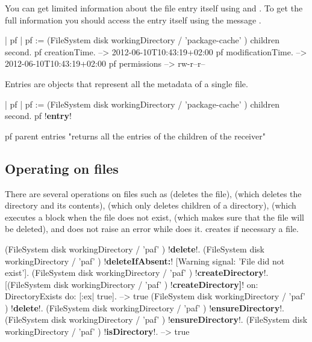 \documentclass[a4paper,10pt,twoside]{book}
\begin{document}
You can get limited information about the file entry itself using  and . 
To get the full information you should access the entry itself using the message . 

\begin{code}{}
| pf |
pf := (FileSystem disk workingDirectory / 'package-cache' ) children second.
pf creationTime.
	--> 2012-06-10T10:43:19+02:00
pf modificationTime.
	--> 2012-06-10T10:43:19+02:00
pf permissions
	--> rw-r--r--
\end{code}

Entries are objects that represent all the metadata of a single file. 
\begin{code}{}
| pf |
pf := (FileSystem disk workingDirectory / 'package-cache' ) children second.
pf !\textbf{entry}!

pf parent entries
	"returns all the entries of the children of the receiver"
\end{code}


\subsection{Operating on files}
There are several operations on files such as  (deletes the file),  (which deletes the directory and its contents),  (which only deletes children of a directory),  (which executes a block when the file does not exist,  (which makes sure that the file will be deleted), and  does not raise an error while  does it.  creates if necessary a file.


\begin{code}{}
(FileSystem disk workingDirectory / 'paf' ) !\textbf{delete}!.
(FileSystem disk workingDirectory / 'paf' ) !\textbf{deleteIfAbsent:}! [Warning signal: 'File did not exist'].
(FileSystem disk workingDirectory / 'paf' ) !\textbf{createDirectory}!.
[(FileSystem disk workingDirectory / 'paf' ) !\textbf{createDirectory]}! on: DirectoryExists do: [:ex| true].
	--> true
(FileSystem disk workingDirectory / 'paf' ) !\textbf{delete}!.
(FileSystem disk workingDirectory / 'paf' ) !\textbf{ensureDirectory}!.
(FileSystem disk workingDirectory / 'paf' ) !\textbf{ensureDirectory}!.
(FileSystem disk workingDirectory / 'paf' ) !\textbf{isDirectory}!.
  --> true
\end{code}
\end{document}
